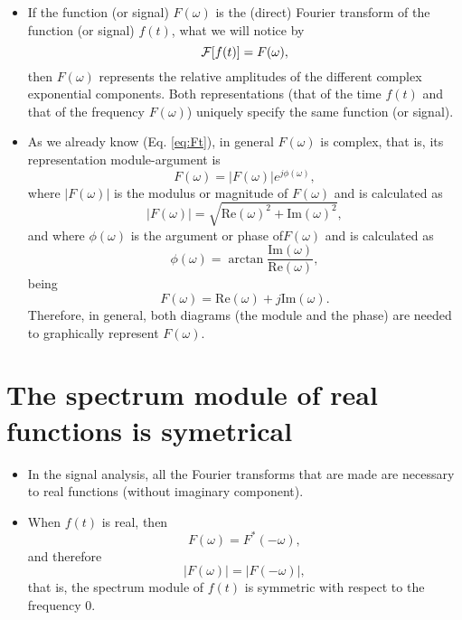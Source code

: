 \begin{itemize}
\item If the function (or signal) $F(\omega)$ is the (direct) Fourier
  transform of the function (or signal) $f(t)$, what we will notice by
  \begin{equation*}
    {\cal{F}}[f(t)] = F(\omega),
  \end{equation*}
  then $F(\omega)$ represents the relative amplitudes of the different
  complex exponential components. Both representations (that of the
  time $f(t)$ and that of the frequency $F(\omega)$) uniquely specify the
  same function (or signal).
\item As we already know (Eq. \ref{eq:Ft}), in general $F(\omega)$ is
  complex, that is, its representation module-argument is
  \begin{equation*}
    F(\omega) = |F(\omega)|e^{j\phi(\omega)},
  \end{equation*}
  where $|F(\omega)|$ is the modulus or magnitude of $F(\omega)$ and
  is calculated as
  \begin{equation*}
    |F(\omega)| = \sqrt{\mathrm{Re}(\omega)^2+\mathrm{Im}(\omega)^2},
  \end{equation*}
  and where $\phi(\omega)$ is the argument or phase of$F(\omega)$ and
  is calculated as
  \begin{equation*}
    \phi(\omega) = \arctan\frac{\mathrm{Im}(\omega)}{\mathrm{Re}(\omega)},
  \end{equation*}
  being
  \begin{equation*}
    F(\omega) = \mathrm{Re}(\omega) + j\mathrm{Im}(\omega).
  \end{equation*}
  Therefore, in general, both diagrams (the module and the phase) are
  needed to graphically represent $F(\omega)$.
\end{itemize}

\section{The spectrum module of real functions is symetrical}
\begin{itemize}
\item In the signal analysis, all the Fourier transforms that are made
  are necessary to real functions (without imaginary component).
\item When $f(t)$ is real, then
  \begin{equation*}
    F(\omega)=F^*(-\omega),
  \end{equation*}
  and therefore
  \begin{equation*}
    |F(\omega)|=|F(-\omega)|,
  \end{equation*}
  that is, the spectrum module of $f(t)$ is symmetric with respect to
  the frequency $0$.
\end{itemize}

